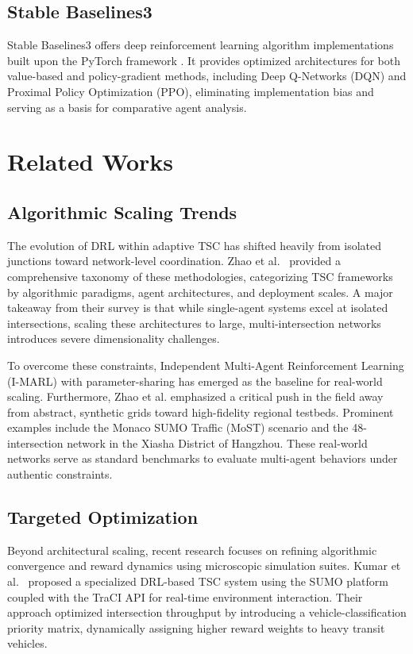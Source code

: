 \documentclass[conference]{IEEEtran}
\begin{document}
\subsection{Stable Baselines3}
Stable Baselines3 offers deep reinforcement learning algorithm implementations built upon the PyTorch framework \cite{stable-baselines3}. It provides optimized architectures for both value-based and policy-gradient methods, including Deep Q-Networks (DQN) and Proximal Policy Optimization (PPO), eliminating implementation bias and serving as a basis for comparative agent analysis.

\section{Related Works}

\subsection{Algorithmic Scaling Trends}
The evolution of DRL within adaptive TSC has shifted heavily from isolated junctions toward network-level coordination. Zhao et al.~\cite{zhao2024survey} provided a comprehensive taxonomy of these methodologies, categorizing TSC frameworks by algorithmic paradigms, agent architectures, and deployment scales. A major takeaway from their survey is that while single-agent systems excel at isolated intersections, scaling these architectures to large, multi-intersection networks introduces severe dimensionality challenges. 

To overcome these constraints, Independent Multi-Agent Reinforcement Learning (I-MARL) with parameter-sharing has emerged as the baseline for real-world scaling. Furthermore, Zhao et al. emphasized a critical push in the field away from abstract, synthetic grids toward high-fidelity regional testbeds. Prominent examples include the Monaco SUMO Traffic (MoST) scenario and the 48-intersection network in the Xiasha District of Hangzhou. These real-world networks serve as standard benchmarks to evaluate multi-agent behaviors under authentic constraints.

\subsection{Targeted Optimization}
Beyond architectural scaling, recent research focuses on refining algorithmic convergence and reward dynamics using microscopic simulation suites. Kumar et al.~\cite{Kumar_2023} proposed a specialized DRL-based TSC system using the SUMO platform coupled with the TraCI API for real-time environment interaction. Their approach optimized intersection throughput by introducing a vehicle-classification priority matrix, dynamically assigning higher reward weights to heavy transit vehicles.
\end{document}
